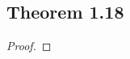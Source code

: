 \documentclass[../../main.tex]{subfiles}
\begin{document}
\subsection{Theorem 1.18}
\begin{wts}

\end{wts}
\begin{proof}

\end{proof}
\end{document}
